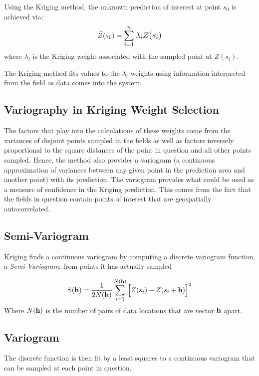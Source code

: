 \documentclass[11pt]{ucthesis}
\begin{document}
Using the Kriging method, the unknown prediction of interest at point $s_{0}$ is achieved via:
\begin{equation}
\widetilde{Z}(s_{0})=\mathlarger{\sum\limits_{i=1}^{n}\lambda_{i}Z(s_{i})}
\end{equation}
where $\lambda_{i}$ is the Kriging weight associated with the sampled point at $Z(s_{i})$.

The Kriging method fits values to the $\lambda_{i}$ weights using information interpreted from the field as data comes into the system. 

\subsection{Variography in Kriging Weight Selection}
The factors that play into the calculations of these weights come from the variances of disjoint points sampled in the fields as well as factors inversely proportional to the square distances of the point in question and all other points sampled. Hence, the method also provides a variogram (a continuous approximation of variances between any given point in the prediction area and another point) with its prediction. The variogram provides what could be used as a measure of confidence in the Kriging prediction. This comes from the fact that the fields in question contain points of interest that are geospatially autocorrelated. 

\subsection{Semi-Variogram}
Kriging finds a continuous variogram by computing a discrete variogram function, a \textit{Semi-Variogram}, from points it has actually sampled

\begin{equation}
\hat{\gamma}({\bf{h}})=\dfrac{1}{2N({\bf{h}})}\sum_{i=1}^{N({\bf{h}})}\Big[Z(s_{i})-Z(s_{i}+{\bf{h}})\Big]^{2}
\end{equation}
Where $N({\bf{h}})$ is the number of pairs of data locations that are vector ${\bf{h}}$ apart.

\subsection{Variogram}
The discrete function is then fit by a least squares to a continuous variogram that can be sampled at each point in question.

\end{document}
